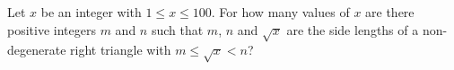 Let $x$ be an integer with $1\le x\le100$. For how many values of $x$ are there positive integers $m$ and $n$ such that $m$, $n$ and $\sqrt{x}$ are the side lengths of a non-degenerate right triangle with $m\le\sqrt{x}<n$?
